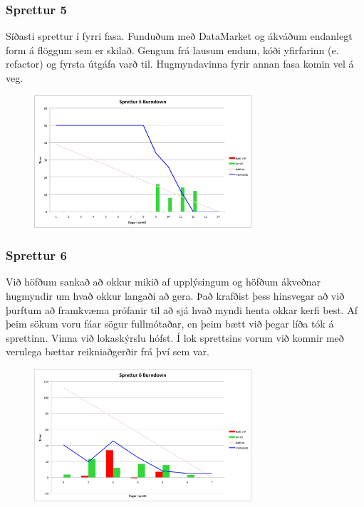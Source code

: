 \documentclass{article}
\begin{document}
\subsubsection{Sprettur 5}
Síðasti sprettur í fyrri fasa. Funduðum með DataMarket og ákváðum endanlegt form á
flöggum sem er skilað. Gengum frá lausum endum, kóði yfirfarinn 
(e. refactor) og fyrsta útgáfa varð til. Hugmyndavinna fyrir annan fasa komin vel á veg.

\begin{figure}[H]
 \centering
 \includegraphics[width=0.72\textwidth]{Sprettur5_Burndown.png}
 \caption{}
\end{figure}

\subsubsection{Sprettur 6}
Við höfðum sankað að okkur mikið af upplýsingum og höfðum ákveðnar hugmyndir um
hvað okkur langaði að gera. Það krafðist þess hinsvegar að við 
þurftum að framkvæma prófanir til að sjá hvað myndi henta okkar kerfi best. 
Af þeim sökum voru fáar sögur fullmótaðar, en þeim bætt við þegar líða tók á sprettinn.
Vinna við lokaskýrslu hófst. Í lok sprettsins vorum við komnir með verulega bættar reikniaðgerðir frá því sem var.

\begin{figure}[H]
 \centering
 \includegraphics[width=0.72\textwidth]{Sprettur6_Burndown.png}
 \caption{}
\end{figure}
\end{document}
